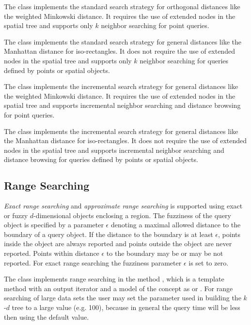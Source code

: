 The class  implements the standard
search strategy for orthogonal distances like the weighted Minkowski
distance. It requires the use of extended nodes in the spatial tree
and supports only $k$ neighbor searching for point queries.

The class  implements the standard search strategy for
general distances like the Manhattan distance for iso-rectangles.
It does not require the use of extended nodes in the spatial tree and supports
only $k$ neighbor searching for queries defined by points or spatial
objects.

The class  implements the incremental
search strategy for general distances like the weighted Minkowski
distance. It requires the use of extended nodes in the spatial tree
and supports incremental neighbor searching and distance browsing for
point queries.

The class  implements the incremental
search strategy for general distances like the Manhattan distance for
iso-rectangles.  It does not require the use of extended nodes in the
spatial tree and supports incremental neighbor searching and distance
browsing for queries defined by points or spatial objects.




\subsection{Range Searching}

{\em Exact range searching} and {\em approximate range searching} is
supported using exact or fuzzy $d$-dimensional objects enclosing a
region.  The fuzziness of the query object is specified by a parameter
$\epsilon$ denoting a maximal allowed distance to the boundary of a
query object.  If the distance to the boundary is at least
$\epsilon$, points inside the object are always reported and points
outside the object are never reported. Points within distance
$\epsilon$ to the boundary may be or may be not reported.  For exact
range searching the fuzziness parameter $\epsilon$ is set to zero.

The class  implements range searching in the method ,
which is a template method with an output iterator and a model of the
concept  as   
or . 
For range searching of large data sets the user may set the parameter  
used in building the $k$-$d$ tree to a large value (e.g. 100), 
because in general the query time will be less then using the default value.

